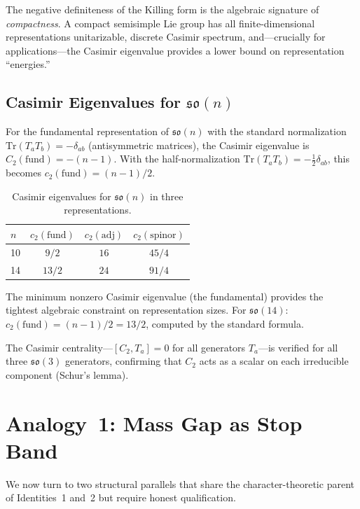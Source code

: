 \documentclass[11pt]{article}
\newcommand{\so}{\mathfrak{so}}
\newcommand{\Tr}{\mathrm{Tr}}
\begin{document}
The negative definiteness of the Killing form is the algebraic signature
of \emph{compactness}. A compact semisimple Lie group has all
finite-dimensional representations unitarizable, discrete Casimir
spectrum, and---crucially for applications---the Casimir eigenvalue
provides a lower bound on representation ``energies.''

\subsection{Casimir Eigenvalues for $\so(n)$}

For the fundamental representation of $\so(n)$ with the standard
normalization $\Tr(T_a T_b) = -\delta_{ab}$ (antisymmetric matrices),
the Casimir eigenvalue is $C_2(\text{fund}) = -(n-1)$. With the
half-normalization $\Tr(T_a T_b) = -\frac{1}{2}\delta_{ab}$, this
becomes $c_2(\text{fund}) = (n-1)/2$.

\begin{table}[htbp]
\centering
\caption{Casimir eigenvalues for $\so(n)$ in three representations.}
\label{tab:casimir}
\begin{tabular}{@{}lccc@{}}
\toprule
$n$ & $c_2(\text{fund})$ & $c_2(\text{adj})$ & $c_2(\text{spinor})$ \\
\midrule
10 & $9/2$ & $16$ & $45/4$ \\
14 & $13/2$ & $24$ & $91/4$ \\
\bottomrule
\end{tabular}
\end{table}

The minimum nonzero Casimir eigenvalue (the fundamental) provides the
tightest algebraic constraint on representation sizes. For $\so(14)$:
$c_2(\text{fund}) = (n-1)/2 = 13/2$, computed by the standard formula.

The Casimir centrality---$[C_2, T_a] = 0$ for all generators
$T_a$---is verified for all three $\so(3)$ generators, confirming
that $C_2$ acts as a scalar on each irreducible component (Schur's
lemma).

\section{Analogy~1: Mass Gap as Stop Band}
\label{sec:analogy-stopband}

We now turn to two structural parallels that share the character-theoretic
parent of Identities~1 and~2 but require honest qualification.
\end{document}
